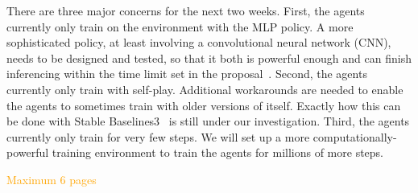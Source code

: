 \documentclass[a4paper]{article}
\newcommand{\instruction}[1]{\textcolor{orange}{#1}}
\begin{document}
There are three major concerns for the next two weeks. First,
the agents currently only train on the environment with the MLP policy.
A more sophisticated policy,
at least involving a convolutional neural network (CNN),
needs to be designed and tested,
so that it both is powerful enough and can finish inferencing within the time
limit set in the proposal~\cite{proposal}. Second,
the agents currently only train with self-play.
Additional workarounds are needed to enable the agents to sometimes train with
older versions of itself.
Exactly how this can be done with Stable Baselines3~\cite{raffin2024stable}
is still under our investigation. Third,
the agents currently only train for very few steps.
We will set up a more computationally-powerful training environment to train the
agents for millions of more steps.

\instruction{Maximum 6 pages}

\printbibliography
\end{document}
